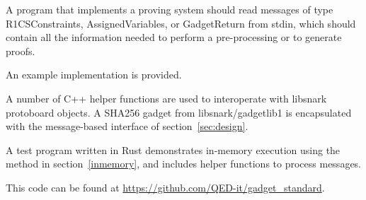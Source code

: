 A program that implements a proving system should read messages of type R1CSConstraints, AssignedVariables, or GadgetReturn from stdin,
which should contain all the information needed to perform a pre-processing
or to generate proofs.



An example implementation is provided.

A number of C++ helper functions are used to interoperate
with libsnark protoboard objects.
A SHA256 gadget from libsnark/gadgetlib1
is encapsulated with the message-based interface of section~\ref{sec:design}.

A test program written in Rust demonstrates
in-memory execution using the method in section~\ref{inmemory},
and includes helper functions to process messages.

This code can be found at \href{https://github.com/QED-it/gadget\_standard}{https://github.com/QED-it/gadget\_standard}.

